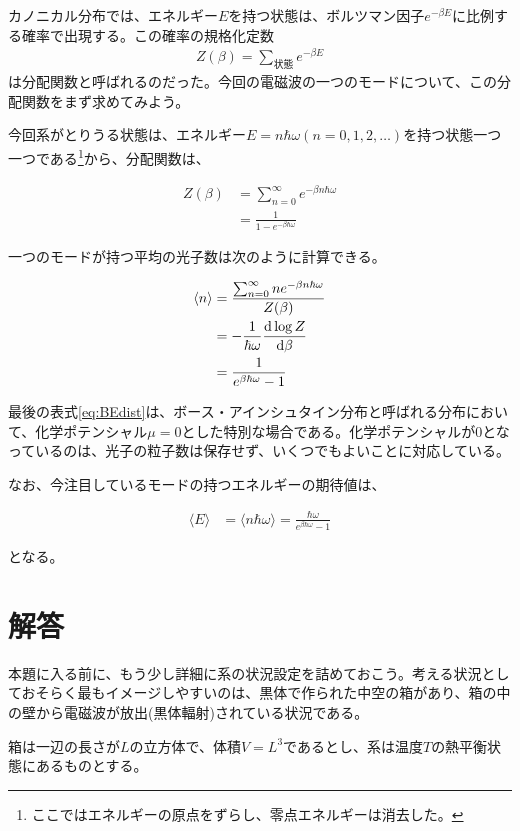 \documentclass[uplatex,dvipdfmx]{jsarticle}
\newcommand{\ave}[1]{\langle #1 \rangle}
\begin{document}
カノニカル分布では、エネルギー$E$を持つ状態は、ボルツマン因子$e^{-\beta E}$に比例する確率で出現する。この確率の規格化定数
\begin{align}
    Z(\beta) = \sum_{状態} e^{-\beta E}    
\end{align}
は分配関数と呼ばれるのだった。今回の電磁波の一つのモードについて、この分配関数をまず求めてみよう。

今回系がとりうる状態は、エネルギー$E=n\hbar\omega(n=0,1,2,\dots)$を持つ状態一つ一つである\footnote{ここではエネルギーの原点をずらし、零点エネルギーは消去した。}から、分配関数は、

\begin{align}
    Z(\beta) &= \sum_{n=0}^{\infty} e^{-\beta n\hbar\omega} \\
    &= \frac{1}{1-e^{-\beta\hbar\omega}}
\end{align}


一つのモードが持つ平均の光子数は次のように計算できる。

\begin{align}
    \ave{n} &= \frac{\sum_{n=0}^{\infty} n e^{-\beta n\hbar\omega}}{Z(\beta)} \\
     &= -\frac{1}{\hbar\omega} \dv{\log{Z}}{\beta} \\
     &= \frac{1}{e^{\beta\hbar\omega}-1} \label{eq:BEdist}
\end{align}

最後の表式\ref{eq:BEdist}は、ボース・アインシュタイン分布と呼ばれる分布において、化学ポテンシャル$\mu=0$とした特別な場合である。化学ポテンシャルが0となっているのは、光子の粒子数は保存せず、いくつでもよいことに対応している。

なお、今注目しているモードの持つエネルギーの期待値は、

\begin{align}
    \ave{E} &= \ave{n\hbar\omega} = \frac{\hbar\omega}{e^{\beta\hbar\omega}-1}  \label{eq:energy}
\end{align}

となる。

\section{解答}
本題に入る前に、もう少し詳細に系の状況設定を詰めておこう。考える状況としておそらく最もイメージしやすいのは、黒体で作られた中空の箱があり、箱の中の壁から電磁波が放出(黒体輻射)されている状況である。

箱は一辺の長さが$L$の立方体で、体積$V=L^3$であるとし、系は温度$T$の熱平衡状態にあるものとする。
\end{document}
